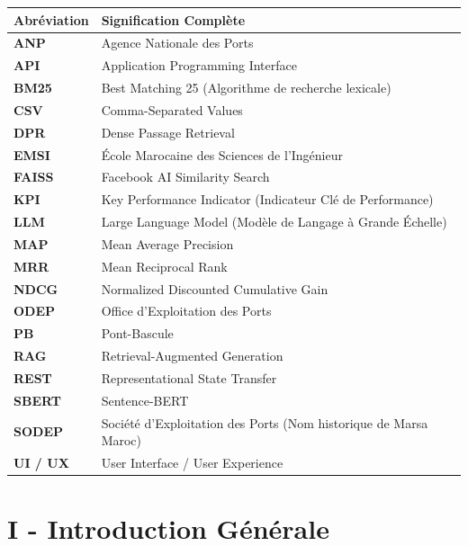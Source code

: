 \documentclass[12pt,a4paper,oneside]{report}
\begin{document}
\begin{table}[H]
\centering
\begin{tabular}{ll}
\toprule
\textbf{Abréviation} & \textbf{Signification Complète} \\
\midrule
\textbf{ANP} & Agence Nationale des Ports \\
\textbf{API} & Application Programming Interface \\
\textbf{BM25} & Best Matching 25 (Algorithme de recherche lexicale) \\
\textbf{CSV} & Comma-Separated Values \\
\textbf{DPR} & Dense Passage Retrieval \\
\textbf{EMSI} & École Marocaine des Sciences de l'Ingénieur \\
\textbf{FAISS} & Facebook AI Similarity Search \\
\textbf{KPI} & Key Performance Indicator (Indicateur Clé de Performance) \\
\textbf{LLM} & Large Language Model (Modèle de Langage à Grande Échelle) \\
\textbf{MAP} & Mean Average Precision \\
\textbf{MRR} & Mean Reciprocal Rank \\
\textbf{NDCG} & Normalized Discounted Cumulative Gain \\
\textbf{ODEP} & Office d'Exploitation des Ports \\
\textbf{PB} & Pont-Bascule \\
\textbf{RAG} & Retrieval-Augmented Generation \\
\textbf{REST} & Representational State Transfer \\
\textbf{SBERT} & Sentence-BERT \\
\textbf{SODEP} & Société d'Exploitation des Ports (Nom historique de Marsa Maroc) \\
\textbf{UI / UX} & User Interface / User Experience \\
\bottomrule
\end{tabular}
\end{table}

\newpage

\chapter*{I - Introduction Générale}
\end{document}
